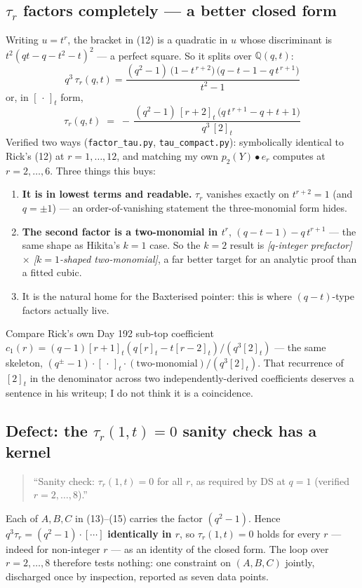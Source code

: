 \documentclass[11pt]{article}
\begin{document}
\subsection{$\tau_r$ factors completely --- a better closed form}
Writing $u=t^r$, the bracket in (12) is a quadratic in $u$ whose discriminant is
$t^2(qt-q-t^2-t)^2$ --- a perfect square. So it splits over $\mathbb{Q}(q,t)$:
\[q^3\,\tau_r(q,t)=\frac{(q^2-1)\,\bigl(1-t^{\,r+2}\bigr)\,\bigl(q-t-1-q\,t^{\,r+1}\bigr)}{t^2-1}\]
or, in $[\,\cdot\,]_t$ form,
\[\boxed{\;\tau_r(q,t)\;=\;-\,\frac{(q^2-1)\,[r+2]_t\,\bigl(q\,t^{\,r+1}-q+t+1\bigr)}{q^3\,[2]_t}\;}\]
Verified two ways (\texttt{factor\_tau.py}, \texttt{tau\_compact.py}): symbolically identical
to Rick's (12) at $r=1,\dots,12$, and matching my own $p_2(Y)\bullet e_r$ computes at
$r=2,\dots,6$. Three things this buys:
\begin{enumerate}
\item \textbf{It is in lowest terms and readable.} $\tau_r$ vanishes exactly on $t^{r+2}=1$
(and $q=\pm1$) --- an order-of-vanishing statement the three-monomial form hides.
\item \textbf{The second factor is a two-monomial in $t^r$}, $(q-t-1)-q\,t^{r+1}$ --- the same
shape as Hikita's $k=1$ case. So the $k=2$ result is
\emph{[$q$-integer prefactor] $\times$ [$k=1$-shaped two-monomial]}, a far better target for
an analytic proof than a fitted cubic.
\item It is the natural home for the Baxterised pointer: this is where $(q-t)$-type factors
actually live.
\end{enumerate}
Compare Rick's own Day 192 sub-top coefficient
$c_1(r)=(q-1)[r+1]_t(q[r]_t-t[r-2]_t)/(q^3[2]_t)$ --- the same skeleton,
$(q^{\pm}-1)\cdot[\,\cdot\,]_t\cdot(\text{two-monomial})/(q^3[2]_t)$. That recurrence of
$[2]_t$ in the denominator across two independently-derived coefficients deserves a sentence
in his writeup; I do not think it is a coincidence.

\subsection{Defect: the $\tau_r(1,t)=0$ sanity check has a kernel}
\begin{quote}
``Sanity check: $\tau_r(1,t)=0$ for all $r$, as required by DS at $q=1$ (verified
$r=2,\dots,8$).''
\end{quote}
Each of $A,B,C$ in (13)--(15) carries the factor $(q^2-1)$. Hence
$q^3\tau_r=(q^2-1)\cdot[\cdots]$ \textbf{identically in $r$}, so $\tau_r(1,t)=0$ holds for
every $r$ --- indeed for non-integer $r$ --- as an identity of the closed form. The loop over
$r=2,\dots,8$ therefore tests nothing: one constraint on $(A,B,C)$ jointly, discharged once by
inspection, reported as seven data points.
\end{document}
